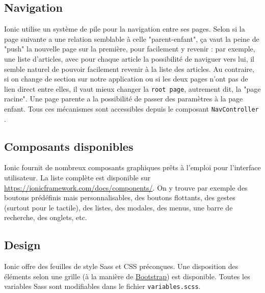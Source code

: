\documentclass[a4paper, 12pt]{article}
\begin{document}
\subsection{Navigation}
Ionic utilise un système de pile pour la navigation entre ses pages. Selon si la page suivante a une relation
semblable à celle "parent-enfant", ça vaut la peine de "push" la nouvelle page sur la première, pour facilement y
revenir : par exemple, une liste d'articles, avec pour chaque article la possibilité de naviguer vers lui, il semble
naturel de pouvoir facilement revenir à la liste des articles. Au contraire, si on change de section sur notre
application ou si les deux pages n'ont pas de lien direct entre elles, il vaut mieux changer la \texttt{root page},
autrement dit, la "page racine". Une page parente a la possibilité de passer des paramètres à la page enfant.
Tous ces mécanismes sont accessibles depuis le composant \texttt{NavController} \cite{ref50}.

\subsection{Composants disponibles}
Ionic fournit de nombreux composants graphiques  prêts à l'emploi pour l'interface utilisateur. La liste complète
est disponible sur \url{https://ionicframework.com/docs/components/}. On y trouve par exemple des boutons prédéfinis
mais personnalisables, des boutons flottants, des gestes (surtout pour le tactile), des listes, des modales, des menus,
une barre de recherche, des onglets, etc.

\subsection{Design}
Ionic offre des feuilles de style Sass et CSS préconçues. Une disposition des éléments
selon une grille (à la manière de \href{http://getbootstrap.com/}{Bootstrap}) est disponible. Toutes les variables Sass
sont modifiables dans le fichier \texttt{variables.scss}.
\end{document}
